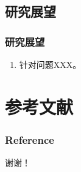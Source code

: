 \documentclass[AutoFakeBold,AutoFakeSlant]{beamer}
\begin{document}
\subsection{研究展望}
\begin{frame}
  \frametitle{研究展望}

  \begin{enumerate}
    \item 针对问题XXX。
  \end{enumerate}
\end{frame}

\section{参考文献}

\begin{frame}
	  \frametitle{Reference}
%	
%	
	
\end{frame}

\begin{frame}[plain]
  
    \LARGE{
   谢谢！}
  
\end{frame}
\end{document}
